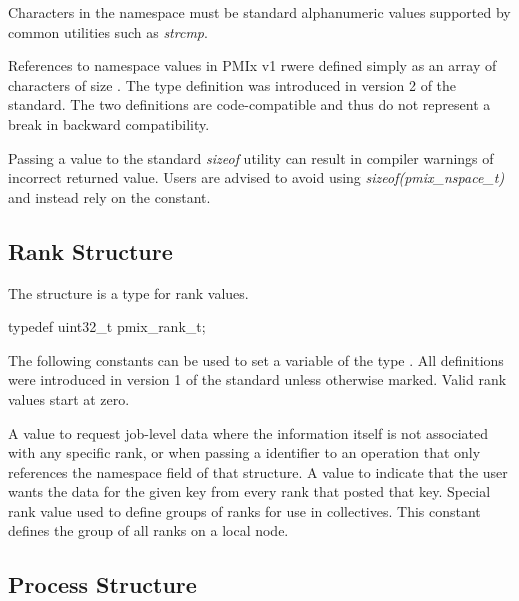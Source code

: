 Characters in the namespace must be standard alphanumeric values supported by common utilities such as \textit{strcmp}.

\adviceuserstart
References to namespace values in \ac{PMIx} v1 rwere defined simply as an array of characters of size . The  type definition was introduced in version 2 of the standard. The two definitions are code-compatible and thus do not represent a break in backward compatibility.

Passing a  value to the standard \textit{sizeof} utility can result in compiler warnings of incorrect returned value. Users are advised to avoid using \textit{sizeof(pmix_nspace_t)} and instead rely on the  constant.
\adviceuserend


\subsection{Rank Structure}

The  structure is a  type for rank values.

\cspecificstart
\begin{codepar}
typedef uint32_t pmix_rank_t;
\end{codepar}
\cspecificend

The following constants can be used to set a variable of the type . All definitions were introduced in version 1 of the standard unless otherwise marked. Valid rank values start at zero.

\begin{constantdesc}
%
A value to request job-level data where the information itself is not associated with any specific rank, or when passing a  identifier to an operation that only references the namespace field of that structure.
%
A value to indicate that the user wants the data for the given key from every rank that posted that key.
%
Special rank value used to define groups of ranks for use in collectives.
This constant defines the group of all ranks on a local node.
%
\end{constantdesc}


\subsection{Process Structure}

